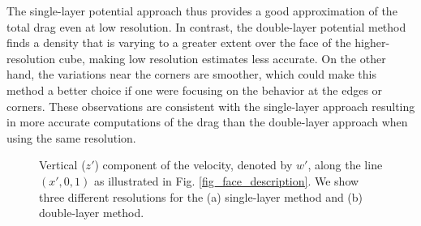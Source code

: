  The single-layer potential approach thus provides a good approximation of the total drag even at low resolution. In contrast, the double-layer potential method finds a density that is varying to a greater extent over the face of the higher-resolution cube, making low resolution estimates less accurate. On the other hand, the variations near the corners are smoother, which could make this method a better choice if one were focusing on the behavior at the edges or corners.  These observations are consistent with the single-layer approach resulting in more accurate computations of the drag than the double-layer approach when using the same resolution.
 \par
 \begin{figure}[ht]
	\begin{center}
		\hspace{0.1cm}
	\end{center}
	\caption{Vertical ($z'$) component of the velocity, denoted by $w'$, along the line $(x',0,1)$ as illustrated in Fig. \ref{fig_face_description}.  We show three different resolutions for the (a) single-layer method and (b)  double-layer method.}
	\label{fig_cross_section}
\end{figure}

